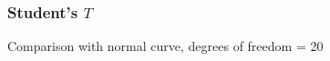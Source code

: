 \documentclass[handout]{beamer}
\begin{document}


   \begin{frame}
   \frametitle{Student's $T$}
   \begin{center}
   \end{center}
   Comparison with normal curve, degrees of freedom = 20
   \end{frame}

\end{document}
